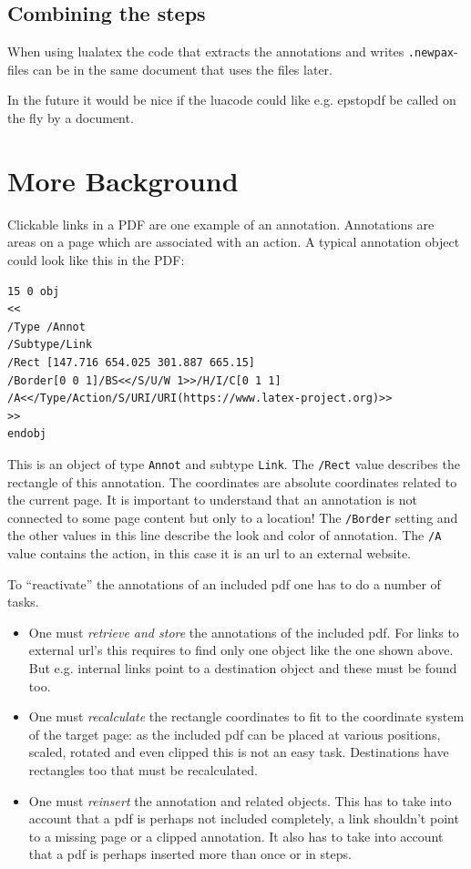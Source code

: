 \documentclass[DIV=12,parskip=half-,bibliography=totoc]{scrartcl}
\begin{document}


\subsection{Combining the steps}

When using lualatex the code that extracts the annotations and writes \texttt{.newpax}-files can be in the same document that uses the files later.

In the future it would be nice if the luacode could like e.g. epstopdf be called on the fly by a document.

\section{More Background}

Clickable links in a PDF are one example of an annotation. Annotations are areas on a page which are associated with an action. A typical annotation object could look like this in the PDF:

\begin{lstlisting}
15 0 obj
<<
/Type /Annot
/Subtype/Link
/Rect [147.716 654.025 301.887 665.15]
/Border[0 0 1]/BS<</S/U/W 1>>/H/I/C[0 1 1]
/A<</Type/Action/S/URI/URI(https://www.latex-project.org)>>
>>
endobj
\end{lstlisting}
This is an object of type \texttt{Annot} and subtype \texttt{Link}.
The \texttt{/Rect} value describes the rectangle of this annotation. The coordinates are absolute coordinates related to the current page. It is important to understand that an annotation is not connected to some page content but only to a location!
The \texttt{/Border} setting and the other values in this line describe the look and color of annotation. The \texttt{/A} value contains the action, in this case it is an url to an external website.


To \enquote{reactivate} the annotations of an included pdf one has to do a number of tasks.
\begin{itemize}
\item One must \emph{retrieve and store} the annotations of the included pdf. For links to external url's this requires to find only one object like the one shown above. But e.g. internal links point to a destination object and these must be found too.
\item One must \emph{recalculate} the rectangle coordinates to fit to the coordinate system of the target page: as the included pdf can be placed at various positions, scaled, rotated and even clipped this is not an easy task. Destinations have rectangles too that must be recalculated.
\item  One must  \emph{reinsert} the annotation and related objects. This has to take into account that a pdf is perhaps not included completely, a link shouldn't point to a missing page or a clipped annotation. It also has to take into account that a pdf is perhaps inserted more than once or in steps.
\end{itemize}
\end{document}
